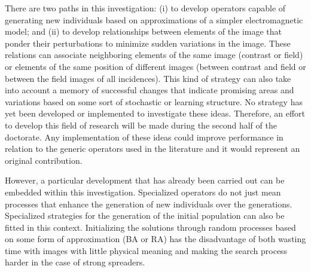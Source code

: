 			There are two paths in this investigation: (i) to develop operators capable of generating new individuals based on approximations of a simpler electromagnetic model; and (ii) to develop relationships between elements of the image that ponder their perturbations to minimize sudden variations in the image. These relations can associate neighboring elements of the same image (contrast or field) or elements of the same position of different images (between contrast and field or between the field images of all incidences). This kind of strategy can also take into account a memory of successful changes that indicate promising areas and variations based on some sort of stochastic or learning structure. No strategy has yet been developed or implemented to investigate these ideas. Therefore, an effort to develop this field of research will be made during the second half of the doctorate. Any implementation of these ideas could improve performance in relation to the generic operators used in the literature and it would represent an original contribution.
			
			However, a particular development that has already been carried out can be embedded within this investigation. Specialized operators do not just mean processes that enhance the generation of new individuals over the generations. Specialized strategies for the generation of the initial population can also be fitted in this context. Initializing the solutions through random processes based on some form of approximation (BA or RA) has the disadvantage of both wasting time with images with little physical meaning and making the search process harder in the case of strong spreaders.
			
